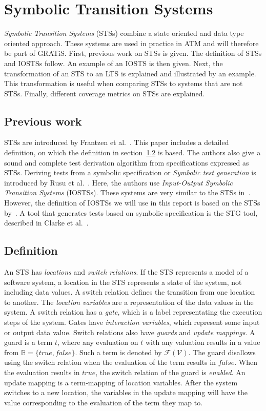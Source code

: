 \section{Symbolic Transition Systems}\label{sec:symbolic}
\textit{Symbolic Transition Systems} (STSs) combine a state oriented and data type oriented approach. These systems are used in practice in ATM and will therefore be part of GRATiS. First, previous work on STSs is given. The definition of STSs and IOSTSs follow. An example of an IOSTS is then given. Next, the transformation of an STS to an LTS is explained and illustrated by an example. This transformation is useful when comparing STSs to systems that are not STSs. Finally, different coverage metrics on STSs are explained.

\subsection{Previous work}
STSs are introduced by Frantzen et al.~\cite{Frantzen:Symbolic}. This paper includes a detailed definition, on which the definition in section~\ref{sec:sts_definition} is based. The authors also give a sound and complete test derivation algorithm from specifications expressed as STSs. Deriving tests from a symbolic specification or \textit{Symbolic test generation} is introduced by Rusu et al.~\cite{rusu:symbolic}. Here, the authors use \textit{Input-Output Symbolic Transition Systems} (IOSTSs). These systems are very similar to the STSs in~\cite{Frantzen:Symbolic}. However, the definition of IOSTSs we will use in this report is based on the STSs by~\cite{Frantzen:Symbolic}. A tool that generates tests based on symbolic specification is the STG tool, described in Clarke et al.~\cite{clarke:STG}.

\subsection{Definition}\label{sec:sts_definition}
An STS has \textit{locations} and \textit{switch relations}. If the STS represents a model of a software system, a location in the STS represents a state of the system, not including data values. A switch relation defines the transition from one location to another. The \textit{location variables} are a representation of the data values in the system. A switch relation has a \textit{gate}, which is a label representating the execution steps of the system. Gates have \textit{interaction variables}, which represent some input or output data value. Switch relations also have \textit{guards} and \textit{update mappings}. A guard is a term $t$, where any evaluation on $t$ with any valuation results in a value from $\mathbb{B} = \{true, false\}$. Such a term is denoted by $\mathcal{F}(\mathcal{V})$. The guard disallows using the switch relation when the evaluation of the term results in $false$. When the evaluation results in $true$, the switch relation of the guard is \textit{enabled}. An update mapping is a term-mapping of location variables. After the system switches to a new location, the variables in the update mapping will have the value corresponding to the evaluation of the term they map to.

